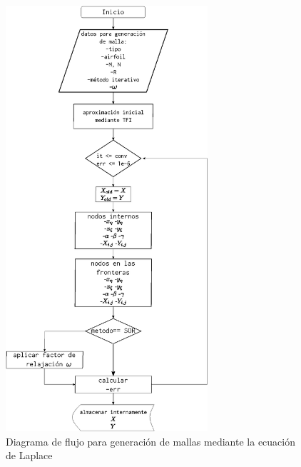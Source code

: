 \documentclass[letterpaper, openright, 12pt]{book}
\begin{document}
    \begin{figure}[htbp!]
        \centering
        \includegraphics[keepaspectratio, width=75mm]
            {./img/flujo_laplace}
        \caption{Diagrama de flujo para generación de mallas mediante la
            ecuación de Laplace}
        \label{flujo_laplace}
    \end{figure}
\end{document}
